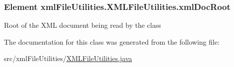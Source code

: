 \subsubsection[{xml\+Doc\+Root}]{\setlength{\rightskip}{0pt plus 5cm}Element xml\+File\+Utilities.\+X\+M\+L\+File\+Utilities.\+xml\+Doc\+Root\hspace{0.3cm}{\ttfamily [static]}}\label{classxmlFileUtilities_1_1XMLFileUtilities_a936db354ec5ded79b915e60aa81ef757}
Root of the X\+M\+L document being read by the class 

The documentation for this class was generated from the following file\+:\begin{DoxyCompactItemize}
\item 
src/xml\+File\+Utilities/\hyperlink{XMLFileUtilities_8java}{X\+M\+L\+File\+Utilities.\+java}\end{DoxyCompactItemize}

